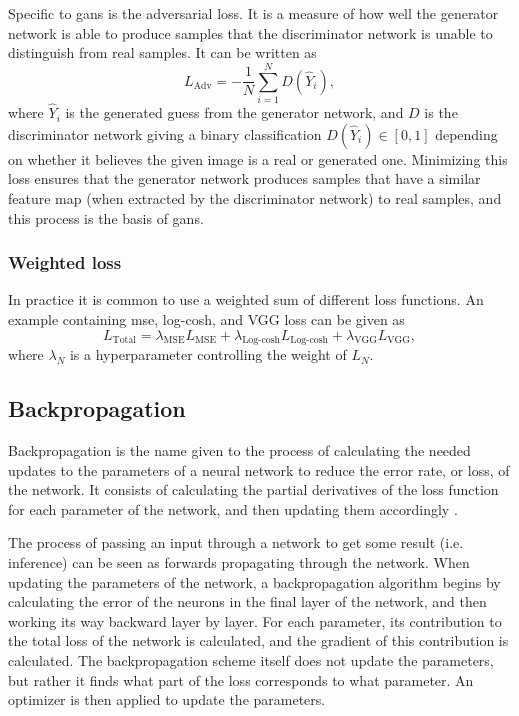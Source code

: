 Specific to \gls{gan}s is the adversarial loss. It is a measure of how well the generator network is able to produce samples that the discriminator network is unable to distinguish from real samples. It can be written as \cite{liu2020tomogan}
\begin{equation}
    \label{eq:lossadv}
    L_{\text{Adv}} = -\frac{1}{N} \sum_{i=1}^{N} D\left(  \hat{Y}_i \right),
\end{equation}
where $\hat{Y}_i$ is the generated guess from the generator network, and $D$ is the discriminator network giving a binary classification $D\left(\hat{Y}_i \right) \in [0,1]$ depending on whether it believes the given image is a real or generated one. Minimizing this loss ensures that the generator network produces samples that have a similar feature map (when extracted by the discriminator network) to real samples, and this process is the basis of \gls{gan}s. 


\subsubsection{Weighted loss}
In practice it is common to use a weighted sum of different loss functions. 
An example containing \gls{mse}, log-cosh, and VGG loss can be given as
\begin{equation}
    \label{eq:weightedloss}
    L_{\text{Total}} = \lambda_{\text{MSE}}L_{\text{MSE}} + \lambda_{\text{Log-cosh}}L_{\text{Log-cosh}} + \lambda_{\text{VGG}}L_{\text{VGG}},
\end{equation}
where $\lambda_N$ is a hyperparameter controlling the weight of $L_N$. 

\subsection{Backpropagation}
Backpropagation is the name given to the process of calculating the needed updates to the parameters of a neural network to reduce the error rate, or loss, of the network. It consists of calculating the partial derivatives of the loss function for each parameter of the network, and then updating them accordingly \cite{Rumelhart1986}. 

The process of passing an input through a network to get some result (i.e. inference) can be seen as forwards propagating through the network. When updating the parameters of the network, a backpropagation algorithm begins by calculating the error of the neurons in the final layer of the network, and then working its way backward layer by layer. For each parameter, its contribution to the total loss of the network is calculated, and the gradient of this contribution is calculated. The backpropagation scheme itself does not update the parameters, but rather it finds what part of the loss corresponds to what parameter. An optimizer is then applied to update the parameters.


